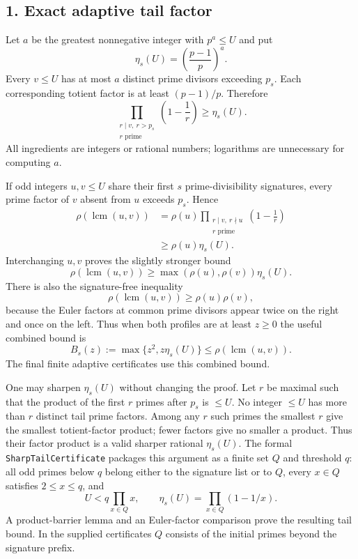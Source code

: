 \subsection*{1. Exact adaptive tail factor}
Let $a$ be the greatest nonnegative integer with $p^a\le U$ and put
\[
\eta_s(U)=\left(\frac{p-1}{p}\right)^a.
\]
Every $v\le U$ has at most $a$ distinct prime divisors exceeding $p_s$. Each corresponding totient factor is at least $(p-1)/p$. Therefore
\[
\prod_{\substack{r\mid v,\ r>p_s\\r\text{ prime}}}\left(1-\frac1r\right)\ge\eta_s(U).
\]
All ingredients are integers or rational numbers; logarithms are unnecessary for computing $a$.

If odd integers $u,v\le U$ share their first $s$ prime-divisibility signatures, every prime factor of $v$ absent from $u$ exceeds $p_s$. Hence
\[
\begin{aligned}
\rho(\operatorname{lcm}(u,v))
&=\rho(u)\prod_{\substack{r\mid v,\ r\nmid u\\r\text{ prime}}}\left(1-\frac1r\right)\\
&\ge\rho(u)\eta_s(U).
\end{aligned}
\]
Interchanging $u,v$ proves the slightly stronger bound
\[
\rho(\operatorname{lcm}(u,v))\ge\max(\rho(u),\rho(v))\eta_s(U).
\]
There is also the signature-free inequality
\[
 \rho(\operatorname{lcm}(u,v))\ge\rho(u)\rho(v),
\]
because the Euler factors at common prime divisors appear twice on the right and once on the left. Thus when both profiles are at least $z\ge0$ the useful combined bound is
\[
 B_s(z):=\max\{z^2,z\eta_s(U)\}\le\rho(\operatorname{lcm}(u,v)).
\]
The final finite adaptive certificates use this combined bound.

One may sharpen $\eta_s(U)$ without changing the proof. Let $r$ be maximal such that the product of the first $r$ primes after $p_s$ is $\le U$. No integer $\le U$ has more than $r$ distinct tail prime factors. Among any $r$ such primes the smallest $r$ give the smallest totient-factor product; fewer factors give no smaller a product. Thus their factor product is a valid sharper rational $\eta_s(U)$. The formal \texttt{SharpTailCertificate} packages this argument as a finite set $Q$ and threshold $q$: all odd primes below $q$ belong either to the signature list or to $Q$, every $x\in Q$ satisfies $2\le x\le q$, and
\[
 U<q\prod_{x\in Q}x,\qquad
 \eta_s(U)=\prod_{x\in Q}(1-1/x).
\]
A product-barrier lemma and an Euler-factor comparison prove the resulting tail bound. In the supplied certificates $Q$ consists of the initial primes beyond the signature prefix.


